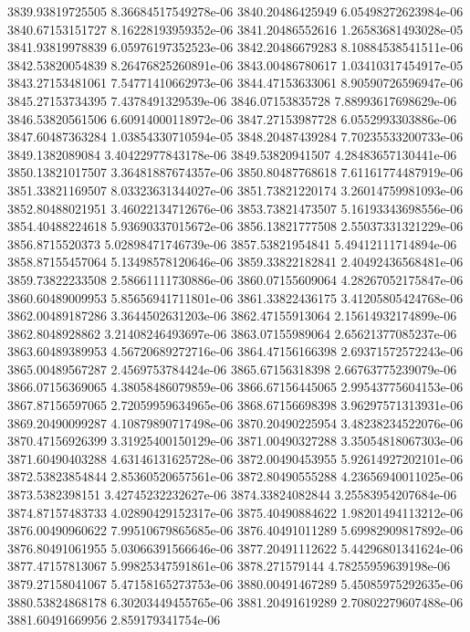 {3839.93819725505 8.36684517549278e-06
3840.20486425949 6.05498272623984e-06
3840.67153151727 8.16228193959352e-06
3841.20486552616 1.26583681493028e-05
3841.93819978839 6.05976197352523e-06
3842.20486679283 8.10884538541511e-06
3842.53820054839 8.26476825260891e-06
3843.00486780617 1.03410317454917e-05
3843.27153481061 7.54771410662973e-06
3844.47153633061 8.90590726596947e-06
3845.27153734395 7.4378491329539e-06
3846.07153835728 7.88993617698629e-06
3846.53820561506 6.60914000118972e-06
3847.27153987728 6.0552993303886e-06
3847.60487363284 1.03854330710594e-05
3848.20487439284 7.70235533200733e-06
3849.1382089084 3.40422977843178e-06
3849.53820941507 4.28483657130441e-06
3850.13821017507 3.36481887674357e-06
3850.80487768618 7.61161774487919e-06
3851.33821169507 8.03323631344027e-06
3851.73821220174 3.26014759981093e-06
3852.80488021951 3.46022134712676e-06
3853.73821473507 5.16193343698556e-06
3854.40488224618 5.93690337015672e-06
3856.13821777508 2.55037331321229e-06
3856.8715520373 5.02898471746739e-06
3857.53821954841 5.49412111714894e-06
3858.87155457064 5.13498578120646e-06
3859.33822182841 2.40492436568481e-06
3859.73822233508 2.58661111730886e-06
3860.07155609064 4.28267052175847e-06
3860.60489009953 5.85656941711801e-06
3861.33822436175 3.41205805424768e-06
3862.00489187286 3.3644502631203e-06
3862.47155913064 2.15614932174899e-06
3862.8048928862 3.21408246493697e-06
3863.07155989064 2.65621377085237e-06
3863.60489389953 4.56720689272716e-06
3864.47156166398 2.69371572572243e-06
3865.00489567287 2.4569753784424e-06
3865.67156318398 2.66763775239079e-06
3866.07156369065 4.38058486079859e-06
3866.67156445065 2.99543775604153e-06
3867.87156597065 2.72059959634965e-06
3868.67156698398 3.96297571313931e-06
3869.20490099287 4.10879890717498e-06
3870.20490225954 3.48238234522076e-06
3870.47156926399 3.31925400150129e-06
3871.00490327288 3.35054818067303e-06
3871.60490403288 4.63146131625728e-06
3872.00490453955 5.92614927202101e-06
3872.53823854844 2.85360520657561e-06
3872.80490555288 4.23656940011025e-06
3873.5382398151 3.42745232232627e-06
3874.33824082844 3.25583954207684e-06
3874.87157483733 4.02890429152317e-06
3875.40490884622 1.98201494113212e-06
3876.00490960622 7.99510679865685e-06
3876.40491011289 5.69982909817892e-06
3876.80491061955 5.03066391566646e-06
3877.20491112622 5.44296801341624e-06
3877.47157813067 5.99825347591861e-06
3878.271579144 4.78255959639198e-06
3879.27158041067 5.47158165273753e-06
3880.00491467289 5.45085975292635e-06
3880.53824868178 6.30203449455765e-06
3881.20491619289 2.70802279607488e-06
3881.60491669956 2.859179341754e-06
}
